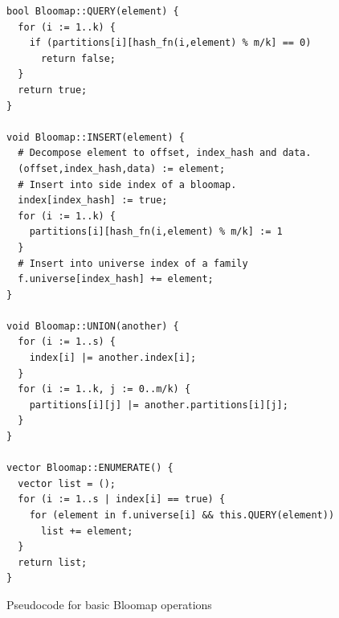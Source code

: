 \begin{figure}[!ht]
\begin{tcolorbox}
\begin{verbatim}
bool Bloomap::QUERY(element) {
  for (i := 1..k) {
    if (partitions[i][hash_fn(i,element) % m/k] == 0)
      return false;
  }
  return true;
}

void Bloomap::INSERT(element) {
  # Decompose element to offset, index_hash and data.
  (offset,index_hash,data) := element;
  # Insert into side index of a bloomap.
  index[index_hash] := true;
  for (i := 1..k) {
    partitions[i][hash_fn(i,element) % m/k] := 1
  }
  # Insert into universe index of a family
  f.universe[index_hash] += element;
}

void Bloomap::UNION(another) {
  for (i := 1..s) {
    index[i] |= another.index[i];
  }
  for (i := 1..k, j := 0..m/k) {
    partitions[i][j] |= another.partitions[i][j];
  }
}

vector Bloomap::ENUMERATE() {
  vector list = ();
  for (i := 1..s | index[i] == true) {
  	for (element in f.universe[i] && this.QUERY(element)) 
      list += element;
  }
  return list;
}

\end{verbatim}
\end{tcolorbox}
\caption{Pseudocode for basic Bloomap operations}
\label{figure-bloomap-fn}
\end{figure}
